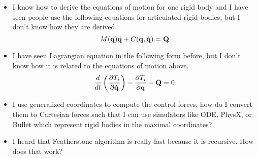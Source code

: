 \begin{itemize}
\item I know how to derive the equations of motion for one rigid body
  and I have seen people use the following equations for articulated
  rigid bodies, but I don't know how they are derived.
\begin{equation}
M(\mathbf{q}) \ddot{\mathbf{q}} + C(\mathbf{q}, \dot{\mathbf{q}})  = \mathbf{Q} \nonumber
\end{equation}

\item I have seen Lagrangian equation in the following form before, but I
  don't know how it is related to the equations of motion above.
\begin{equation}\label{eq:lagrangian_dyn}
    \frac{d}{dt} \left( \frac{\partial T_i}{\partial
    \dot{\mathbf{q}}} \right) - \frac{\partial T_i}{\partial
    \mathbf{q}} - \mathbf{Q} = 0 \nonumber
\end{equation}

\item I use generalized coordinates to compute the control forces, how do I convert them to Cartesian forces such that I can use simulators like ODE, PhysX, or Bullet which represent rigid bodies in the maximal coordinates?

\item I heard that Featherstone algorithm is really fast because it is
  recursive. How does that work?
\end{itemize}

